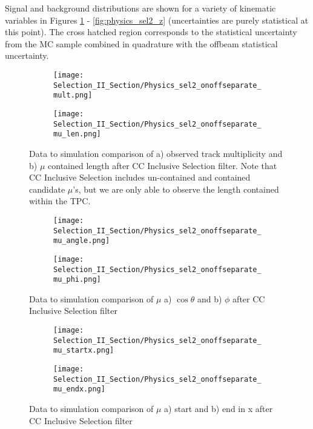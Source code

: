 Signal and background distributions are shown for a variety of kinematic variables in Figures \ref{fig:physics_sel2_mulen} - \ref{fig:physics_sel2_z} (uncertainties are purely statistical at this point). The cross hatched region corresponds to the statistical uncertainty from the MC sample combined in quadrature with the offbeam statistical uncertainty.

\begin{figure}[h!]
\centering
  \begin{subfigure}[t]{0.3\textwidth}
    \centering
\texttt{[image: Selection\_II\_Section/Physics\_sel2\_onoffseparate\_mult.png]}
    \caption{ }
  \end{subfigure} 
  \hspace{30 mm}
  \begin{subfigure}[t]{0.3\textwidth}
    \centering
\texttt{[image: Selection\_II\_Section/Physics\_sel2\_onoffseparate\_mu\_len.png]}
    \caption{ }
  \end{subfigure} 
 
\caption{ Data to simulation comparison of a) observed track multiplicity and b) $\mu$ contained length after CC Inclusive Selection filter.  Note that CC Inclusive Selection includes un-contained and contained candidate $\mu$'s, but we are only able to observe the length contained within the TPC.  }
\label{fig:physics_sel2_mulen}
\end{figure}

\begin{figure}[h!]
\centering
  \begin{subfigure}[t]{0.3\textwidth}
    \centering
\texttt{[image: Selection\_II\_Section/Physics\_sel2\_onoffseparate\_mu\_angle.png]}
   \caption{ }
  \end{subfigure} 
  \hspace{30 mm}
  \begin{subfigure}[t]{0.3\textwidth}
    \centering
    \texttt{[image: Selection\_II\_Section/Physics\_sel2\_onoffseparate\_mu\_phi.png]}
  \caption{ }
  \end{subfigure} 
\caption{ Data to simulation comparison of $\mu$ a) $\cos\theta$  and b) $\phi$ after CC Inclusive Selection filter }
\label{fig:physics_sel2_muphi}
\end{figure}

\begin{figure}[t!]
\centering
  \begin{subfigure}[t]{0.3\textwidth}
    \centering
\texttt{[image: Selection\_II\_Section/Physics\_sel2\_onoffseparate\_mu\_startx.png]}
   \caption{ }
  \end{subfigure} 
  \hspace{30 mm}
  \begin{subfigure}[t]{0.3\textwidth}
    \centering
\texttt{[image: Selection\_II\_Section/Physics\_sel2\_onoffseparate\_mu\_endx.png]}
   \caption{ }
  \end{subfigure} 
\caption{ Data to simulation comparison of $\mu$ a) start and b) end in x after CC Inclusive Selection filter }
\label{fig:physics_sel2_x}
\end{figure}

